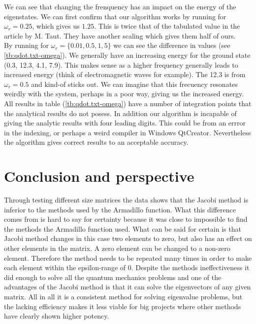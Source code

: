 \documentclass{article}
\begin{document}
  We can see that changing the frenquency has an impact on the energy of the eigenstates. We can first confirm that our algorithm works by running for $ \omega_r=0.25$, which gives us $1.25$. This is twice that of the tabulated value in the article by M. Taut. They have another scaling which gives them half of ours. \\

  By running for $ \omega_r= \{ 0.01, 0.5, 1, 5 \}$ we can see the difference in values (see \ref{tb:qdot.txt-omega}). We generally have an increasing energy for the ground state (0.3, 12.3, 4.1, 7.9). This makes sense as a higher frequency generally leads to increased energy (think of electromagnetic waves for example). The 12.3 is from $\omega_r=0.5$ and kind-of sticks out. We can imagine that this frecuency resonates weirdly with the system, perhaps in a poor way, giving us the increased energy. \\

  All results in table (\ref{tb:qdot.txt-omega}) have a number of integration points that the analytical results do not posess. In addition our algorithm is incapable of giving the analytic results with four leading digits. This could be from an errror in the indexing, or perhaps a weird compiler in Windows QtCreator. Nevertheless the algorithm gives correct results to an acceptable accuracy.


\vspace{1cm}

\section{Conclusion and perspective} \label{sec:Conclusion}

Through testing different size matrices the data shows that the Jacobi method is inferior to the methods used by the Armadillo function. What this difference comes from is hard to say for certainty because it was close to impossible to find the methods the Armadillo function used. What can be said for certain is that Jacobi method changes in this case two elements to zero, but also has an effect on other elements in the matrix. A zero element can be changed to a non-zero element. Therefore the method needs to be repeated many times in order to make each element within the epsilon-range of 0. Despite the methods ineffectiveness it did enough to solve all the quantum mechanics problems and one of the advantages of the Jacobi method is that it can solve the eigenvectors of any given matrix. All in all it is a consistent method for solving eigenvalue problems, but the lacking efficiency makes it less viable for big projects where other methods have clearly shown higher potency.
\end{document}
